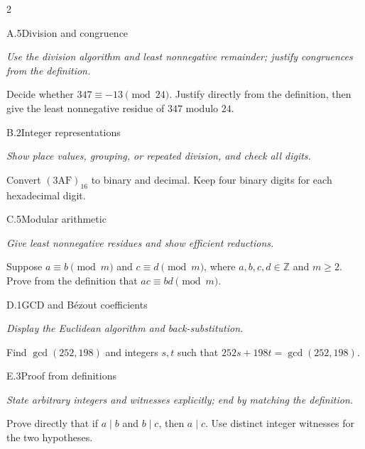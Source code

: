 \documentclass[9pt]{extarticle}
\begin{document}
\begin{multicols}{2}
\begin{CoreProblem}{A.5}{Division and congruence}
{\scriptsize\textit{Use the division algorithm and least nonnegative remainder; justify congruences from the definition.}\par}
Decide whether $347\equiv-13\pmod{24}$. Justify directly from the definition,
then give the least nonnegative residue of $347$ modulo $24$.
\end{CoreProblem}
\begin{CoreProblem}{B.2}{Integer representations}
{\scriptsize\textit{Show place values, grouping, or repeated division, and check all digits.}\par}
Convert $(\mathrm{3AF})_{16}$ to binary and decimal. Keep four binary digits
for each hexadecimal digit.
\end{CoreProblem}
\begin{CoreProblem}{C.5}{Modular arithmetic}
{\scriptsize\textit{Give least nonnegative residues and show efficient reductions.}\par}
Suppose $a\equiv b\pmod m$ and $c\equiv d\pmod m$, where
$a,b,c,d\in\mathbb Z$ and $m\ge2$. Prove from the definition that
$ac\equiv bd\pmod m$.
\end{CoreProblem}
\columnbreak
\begin{CoreProblem}{D.1}{GCD and B\'ezout coefficients}
{\scriptsize\textit{Display the Euclidean algorithm and back-substitution.}\par}
Find $\gcd(252,198)$ and integers $s,t$ such that
$252s+198t=\gcd(252,198)$.
\end{CoreProblem}
\begin{CoreProblem}{E.3}{Proof from definitions}
{\scriptsize\textit{State arbitrary integers and witnesses explicitly; end by matching the definition.}\par}
Prove directly that if $a\mid b$ and $b\mid c$, then $a\mid c$. Use distinct
integer witnesses for the two hypotheses.
\end{CoreProblem}
\end{multicols}
\CoreWorkArea
\FormBreak
{}
\end{document}
